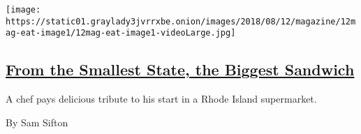 \begin{enumerate}
  \texttt{[image: https://static01.graylady3jvrrxbe.onion/images/2018/08/12/magazine/12mag-eat-image1/12mag-eat-image1-videoLarge.jpg]}

  \hypertarget{from-the-smallest-state-the-biggest-sandwich}{%
  \subsection{\texorpdfstring{\href{/2018/08/07/magazine/rhode-island-chorizo-sandwich.html}{From
  the Smallest State, the Biggest
  Sandwich}}{From the Smallest State, the Biggest Sandwich}}\label{from-the-smallest-state-the-biggest-sandwich}}

  A chef pays delicious tribute to his start in a Rhode Island
  supermarket.

  By Sam Sifton
\end{enumerate}

